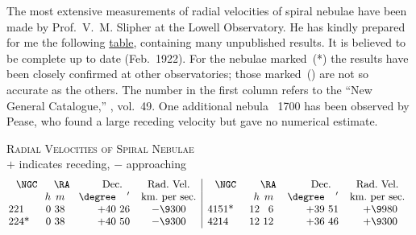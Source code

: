 \documentclass[12pt]{book}
\begin{document}
The most extensive measurements of radial velocities of spiral nebulae
%
%
have been made by Prof.\ V.~M. Slipher at the Lowell Observatory. He has
kindly prepared for me the following \hyperref[table:70.1]{table}, containing many unpublished
results. It is believed to be complete up to date (Feb.~1922). For the nebulae
marked~(*) the results have been closely confirmed at other observatories;
those marked~(\dag) are not so accurate as the others. The number in the first
column refers to the ``New General Catalogue,'' , vol.~49. One
additional nebula \NGC\ 1700 has been observed by Pease, who found a large
receding velocity but gave no numerical estimate.
\begin{table}[hb]
  \centering
\textsc{Radial Velocities of Spiral Nebulae} \\
$+$ indicates receding, $-$ approaching
\label{table:70.1}%
\[
\small
\begin{array}{@{}r@{\qquad}r@{\ }r@{\quad\ }r@{\ }rc|r@{\qquad}r@{\ }r@{\quad\ }r@{\ }rc@{}}
  \multicolumn{1}{c}{\text{\NGC}} & \multicolumn{2}{c}{\RA} & \multicolumn{2}{c}{\text{\quad Dec.}} & \multicolumn{1}{c|}{\text{Rad.\ Vel.}} &
  \multicolumn{1}{c}{\text{\NGC}} & \multicolumn{2}{c}{\RA} & \multicolumn{2}{c}{\text{\quad Dec.}} & \multicolumn{1}{c}{\text{Rad.\ Vel.}} \\
  & h & m & \degree & ' & \multicolumn{1}{c|}{\text{km.\ per sec.}} &
  & h & m & \degree & ' & \multicolumn{1}{c}{\text{km.\ per sec.}} \\
  221 & 0 & 38 & +40 & 26 & -\9 300 & 4151\rlap{*} & 12 & 6 & +39 & 51 & +\9 980 \\
  224\rlap{*} & 0 & 38 & +40 & 50 & -\9 300 & 4214 & 12 & 12 & +36 & 46 & +\9 300 \\


\end{array}\]
\end{table}
\end{document}
